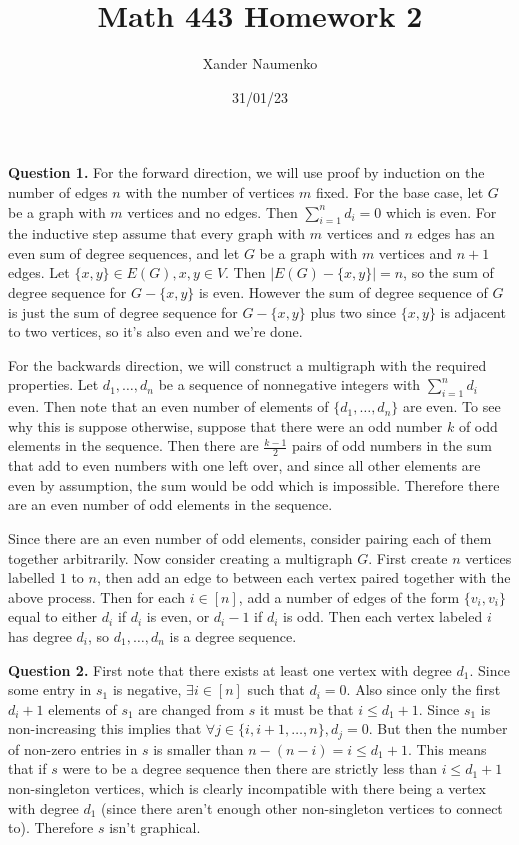 \documentclass[letterpaper, reqno,11pt]{article}
\begin{document}
\title{Math 443 Homework 2}
\date{31/01/23}
\author{Xander Naumenko}
\maketitle

{\medskip\noindent\bf Question 1.} For the forward direction, we will use proof by induction on the number of edges $n$ with the number of vertices $m$ fixed. For the base case, let $G$ be a graph with $m$ vertices and no edges. Then $\sum_{i=1}^{n}d_i=0$ which is even. For the inductive step assume that every graph with $m$ vertices and $n$ edges has an even sum of degree sequences, and let $G$ be a graph with $m$ vertices and $n+1$ edges. Let $\{x,y\}\in E(G), x,y\in V$. Then $|E(G)-\{x,y\}|=n$, so the sum of degree sequence for $G-\{x,y\}$ is even. However the sum of degree sequence of $G$ is just the sum of degree sequence for $G-\{x,y\} $ plus two since $\{x,y\} $ is adjacent to two vertices, so it's also even and we're done. 

For the backwards direction, we will construct a multigraph with the required properties. Let $d_1,\ldots,d_n$ be a sequence of nonnegative integers with $\sum_{i=1}^{n}d_i$ even. Then note that an even number of elements of $\{d_1,\ldots,d_n\}$ are even. To see why this is suppose otherwise, suppose that there were an odd number $k$ of odd elements in the sequence. Then there are $\frac{k-1}{2}$ pairs of odd numbers in the sum that add to even numbers with one left over, and since all other elements are even by assumption, the sum would be odd which is impossible. Therefore there are an even number of odd elements in the sequence. 

Since there are an even number of odd elements, consider pairing each of them together arbitrarily. Now consider creating a multigraph $G$. First create $n$ vertices labelled $1$ to $n$, then add an edge to between each vertex paired together with the above process. Then for each $i\in[n]$, add a number of edges of the form $\{v_i,v_i\} $ equal to either $d_i$ if $d_i$ is even, or $d_i-1$ if $d_i$ is odd. Then each vertex labeled $i$ has degree $d_i$, so $d_1,\ldots,d_n$ is a degree sequence. 

{\medskip\noindent\bf Question 2.} First note that there exists at least one vertex with degree $d_1$. Since some entry in $s_1$ is negative, $\exists i\in [n]$ such that $d_i=0$. Also since only the first $d_i+1$ elements of $s_1$ are changed from $s$ it must be that $i\leq d_1+1$. Since $s_1$ is non-increasing this implies that $\forall j\in \{i, i+1,\ldots, n\}, d_j=0$. But then the number of non-zero entries in $s$ is smaller than $n-(n-i)=i\leq d_1+1$. This means that if $s$ were to be a degree sequence then there are strictly less than $i\leq d_1+1$ non-singleton vertices, which is clearly incompatible with there being a vertex with degree $d_1$ (since there aren't enough other non-singleton vertices to connect to). Therefore $s$ isn't graphical. 
\end{document}
